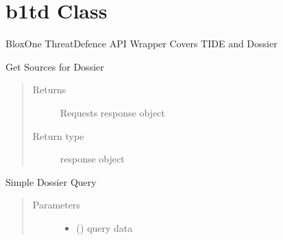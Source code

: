 \documentclass[letterpaper,10pt,english]{sphinxmanual}
\begin{document}
\section{b1td Class}
\label{\detokenize{b1td-class:b1td-class}}\label{\detokenize{b1td-class::doc}}

\begin{fulllineitems}
\label{\detokenize{b1td-class:bloxone.b1td}}
\sphinxAtStartPar
BloxOne ThreatDefence API Wrapper
Covers TIDE and Dossier

\begin{fulllineitems}
\label{\detokenize{b1td-class:bloxone.b1td.dossier_sources}}
\sphinxAtStartPar
Get Sources for Dossier
\begin{quote}\begin{description}
\item[{Returns}] \leavevmode
\sphinxAtStartPar
Requests response object

\item[{Return type}] \leavevmode
\sphinxAtStartPar
response object

\end{description}\end{quote}

\end{fulllineitems}


\begin{fulllineitems}
\label{\detokenize{b1td-class:bloxone.b1td.dossierquery}}
\sphinxAtStartPar
Simple Dossier Query
\begin{quote}\begin{description}
\item[{Parameters}] \leavevmode\begin{itemize}
\item {} 
\sphinxAtStartPar
{} () \textendash{} query data


\end{itemize}
\end{description}
\end{quote}
\end{fulllineitems}
\end{fulllineitems}
\end{document}
